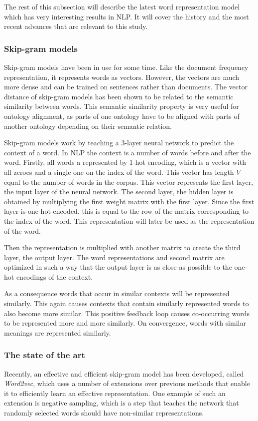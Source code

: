 \documentclass{article}
\begin{document}
 The rest of this subsection will describe the latest word representation model which has very interesting results in NLP. It will cover the history and the most recent advances that are relevant to this study.
 
 \subsubsection{Skip-gram models}
 Skip-gram models have been in use for some time. Like the document frequency representation, it represents words as vectors. However, the vectors are much more dense and can be trained on sentences rather than documents. The vector distance of skip-gram models has been shown to be related to the semantic similarity between words. This semantic similarity property is very useful for ontology alignment, as parts of one ontology have to be aligned with parts of another ontology depending on their semantic relation.
 
 Skip-gram models work by teaching a 3-layer neural network to predict the context of a word. In NLP the context is a number of words before and after the word. Firstly, all words a represented by 1-hot encoding, which is a vector with all zeroes and a single one on the index of the word. This vector has length $V$ equal to the number of words in the corpus. This vector represents the first layer, the input layer of the neural network. The second layer, the hidden layer is obtained by multiplying the first weight matrix with the first layer. Since the first layer is one-hot encoded, this is equal to the row of the matrix corresponding to the index of the word. This representation will later be used as the representation of the word.
 
 Then the representation is multiplied with another matrix to create the third layer, the output layer. The word representations and second matrix are optimized in such a way that the output layer is as close as possible to the one-hot encodings of the context.
 
 As a consequence words that occur in similar contexts will be represented similarly. This again causes contexts that contain similarly represented words to also become more similar. This positive feedback loop causes co-occurring words to be represented more and more similarly. On convergence, words with similar meanings are represented similarly.

 \subsubsection{The state of the art}
 Recently, an effective and efficient skip-gram model has been developed, called \emph{Word2vec}, which uses a number of extensions over previous methods that enable it to efficiently learn an effective representation\cite{w2v}. One example of such an extension is negative sampling, which is a step that teaches the network that randomly selected words should have non-similar representations.
 
\end{document}
